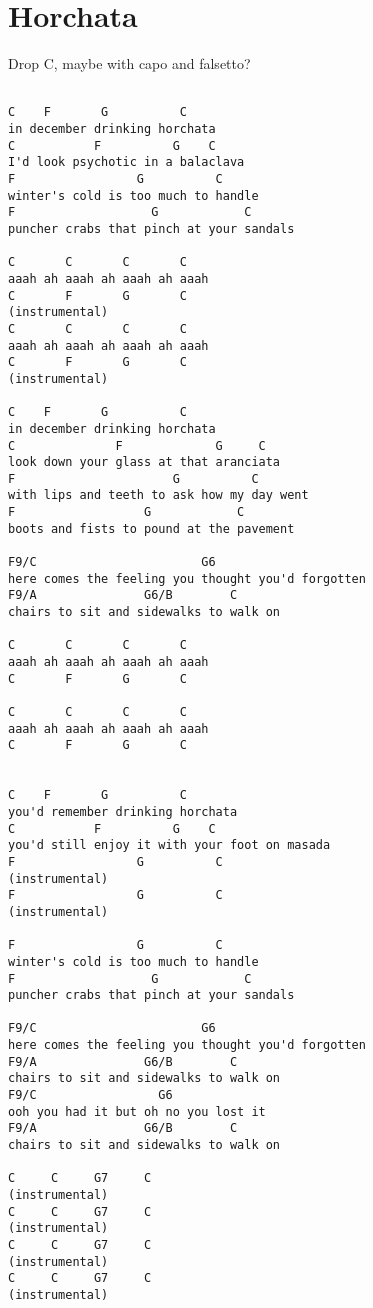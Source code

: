 \documentclass[leqno]{memoir}
\begin{document}
\chapter{Horchata}
Drop C, maybe with capo and falsetto?
\begin{verbatim}

C    F       G          C
in december drinking horchata
C           F          G    C
I'd look psychotic in a balaclava
F                 G          C
winter's cold is too much to handle
F                   G            C
puncher crabs that pinch at your sandals

C       C       C       C 
aaah ah aaah ah aaah ah aaah
C       F       G       C
(instrumental)
C       C       C       C 
aaah ah aaah ah aaah ah aaah
C       F       G       C
(instrumental)

C    F       G          C
in december drinking horchata
C              F             G     C
look down your glass at that aranciata
F                      G          C
with lips and teeth to ask how my day went
F                  G            C
boots and fists to pound at the pavement

F9/C                       G6
here comes the feeling you thought you'd forgotten
F9/A               G6/B        C 
chairs to sit and sidewalks to walk on

C       C       C       C 
aaah ah aaah ah aaah ah aaah
C       F       G       C

C       C       C       C 
aaah ah aaah ah aaah ah aaah
C       F       G       C


C    F       G          C
you'd remember drinking horchata
C           F          G    C
you'd still enjoy it with your foot on masada
F                 G          C
(instrumental)
F                 G          C
(instrumental)

F                 G          C
winter's cold is too much to handle
F                   G            C
puncher crabs that pinch at your sandals

F9/C                       G6
here comes the feeling you thought you'd forgotten
F9/A               G6/B        C
chairs to sit and sidewalks to walk on
F9/C                 G6
ooh you had it but oh no you lost it
F9/A               G6/B        C
chairs to sit and sidewalks to walk on 

C     C     G7     C
(instrumental)
C     C     G7     C
(instrumental)
C     C     G7     C
(instrumental)
C     C     G7     C
(instrumental)
















\end{verbatim}
\end{document}
